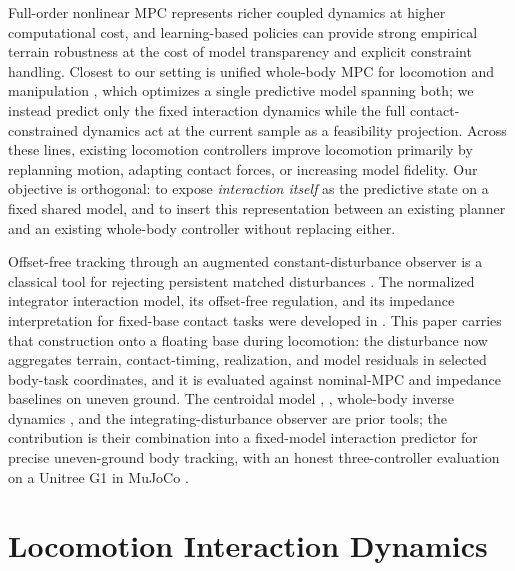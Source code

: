 \documentclass[journal]{IEEEtran}
\theoremstyle{plain}
\theoremstyle{definition}
\theoremstyle{remark}
\begin{document}
Full-order nonlinear MPC represents richer coupled dynamics at higher computational cost, and learning-based policies can provide strong empirical terrain robustness at the cost of model transparency and explicit constraint handling. Closest to our setting is unified whole-body MPC for locomotion and manipulation \cite{ref10}, which optimizes a single predictive model spanning both; we instead predict only the fixed interaction dynamics while the full contact-constrained dynamics act at the current sample as a feasibility projection. Across these lines, existing locomotion controllers improve locomotion primarily by replanning motion, adapting contact forces, or increasing model fidelity. Our objective is orthogonal: to expose \emph{interaction itself} as the predictive state on a fixed shared model, and to insert this representation between an existing planner and an existing whole-body controller without replacing either.

Offset-free tracking through an augmented constant-disturbance observer is a classical tool for rejecting persistent matched disturbances \cite{ref16}. The normalized integrator interaction model, its offset-free regulation, and its impedance interpretation for fixed-base contact tasks were developed in \cite{ref1}. This paper carries that construction onto a floating base during locomotion: the disturbance now aggregates terrain, contact-timing, realization, and model residuals in selected body-task coordinates, and it is evaluated against nominal-MPC and impedance baselines on uneven ground. The centroidal model \cite{ref8}, \cite{ref17}, whole-body inverse dynamics \cite{ref9}, and the integrating-disturbance observer \cite{ref16} are prior tools; the contribution is their combination into a fixed-model interaction predictor for precise uneven-ground body tracking, with an honest three-controller evaluation on a Unitree G1 in MuJoCo \cite{ref15}.

\section{Locomotion Interaction Dynamics}\label{sec:dynamics}
\end{document}
